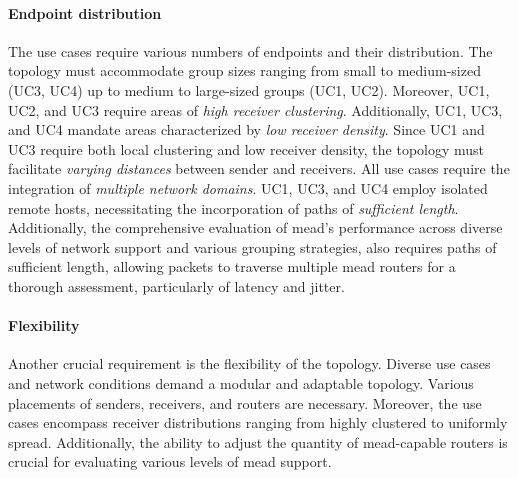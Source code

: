 \paragraph{Endpoint distribution} %
\label{par:Endpoint distribution}
The use cases require various numbers of endpoints and their distribution.
The topology must accommodate group sizes ranging from small to medium-sized
    (UC3, UC4) up to medium to large-sized groups (UC1, UC2).
Moreover, UC1, UC2, and UC3 require areas of \textit{high receiver clustering}.
Additionally, UC1, UC3, and UC4 mandate areas characterized by \textit{low
    receiver density}.
Since UC1 and UC3 require both local clustering and low receiver density, the
    topology must facilitate \textit{varying distances} between sender and
    receivers.
All use cases require the integration of \textit{multiple network domains}.
UC1, UC3, and UC4 employ isolated remote hosts, necessitating the incorporation
    of paths of \textit{sufficient length}.
Additionally, the comprehensive evaluation of \gls{mead}'s performance across
    diverse levels of network support and various grouping strategies, also
    requires paths of sufficient length, allowing packets to traverse multiple
    \gls{mead} routers for a thorough assessment, particularly of latency and
    jitter.

\paragraph{Flexibility} %
\label{par:Flexibility2}
Another crucial requirement is the flexibility of the topology.
Diverse use cases and network conditions demand a modular and adaptable
    topology.
Various placements of senders, receivers, and routers are necessary.
Moreover, the use cases encompass receiver distributions ranging from highly
    clustered to uniformly spread.
Additionally, the ability to adjust the quantity of \gls{mead}-capable routers
    is crucial for evaluating various levels of \gls{mead} support.


